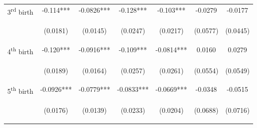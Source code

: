\documentclass{article}[11pt,subeqn]
\begin{document}
\begin{spacing}{1.5}
\begin{sidewaystable}[!htbp]
\begin{center}
\begin{tabular}{lcccccc}
3\textsuperscript{rd} birth	&	-0.114***	&	-0.0826***	&	-0.128***	&	-0.103***	&	-0.0279	&	-0.0177	\\  
\vspace{4pt}	& \begin{footnotesize}	(0.0181)	\end{footnotesize} & \begin{footnotesize}	(0.0145)	\end{footnotesize} & \begin{footnotesize}	(0.0247)	\end{footnotesize} & \begin{footnotesize}	(0.0217)	\end{footnotesize} & \begin{footnotesize}	(0.0577)	\end{footnotesize} & \begin{footnotesize}	(0.0445)	\end{footnotesize} \\
4\textsuperscript{th} birth	&	-0.120***	&	-0.0916***	&	-0.109***	&	-0.0814***	&	0.0160	&	0.0279	\\  
\vspace{4pt}	& \begin{footnotesize}	(0.0189)	\end{footnotesize} & \begin{footnotesize}	(0.0164)	\end{footnotesize} & \begin{footnotesize}	(0.0257)	\end{footnotesize} & \begin{footnotesize}	(0.0261)	\end{footnotesize} & \begin{footnotesize}	(0.0554)	\end{footnotesize} & \begin{footnotesize}	(0.0549)	\end{footnotesize} \\
5\textsuperscript{th} birth	&	-0.0926***	&	-0.0779***	&	-0.0833***	&	-0.0669***	&	-0.0348	&	-0.0515	\\  
\vspace{4pt}	& \begin{footnotesize}	(0.0176)	\end{footnotesize} & \begin{footnotesize}	(0.0139)	\end{footnotesize} & \begin{footnotesize}	(0.0233)	\end{footnotesize} & \begin{footnotesize}	(0.0204)	\end{footnotesize} & \begin{footnotesize}	(0.0688)	\end{footnotesize} & \begin{footnotesize}	(0.0716)	\end{footnotesize} \\

\end{tabular}
\end{center}
\end{sidewaystable}
\end{spacing}
\end{document}
